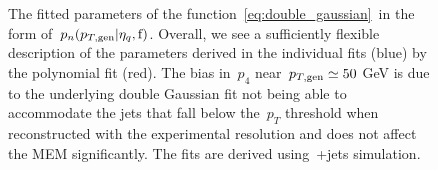 \begin{figure}
\begin{centering}
 \\
 \\
\caption[The dependence of the transfer function fit parameters on jet kinematics]{The fitted parameters of the function~\cref{eq:double_gaussian}~in the form of~$p_n(p_{T,\mathrm{gen}}|\eta_{q},\mathrm{f})$. Overall, we see a sufficiently flexible description of the parameters derived in the individual fits (blue) by the polynomial fit (red). The bias in~$p_4$ near~$p_{T,\mathrm{gen}} \simeq 50$ GeV is due to the underlying double Gaussian fit not being able to accommodate the jets that fall below the~$p_T$ threshold when reconstructed with the experimental resolution and does not affect the MEM significantly. The fits are derived using~\ttbar+jets simulation.}
\label{fig:transfer_acrossbin}
\end{centering}
\end{figure}


